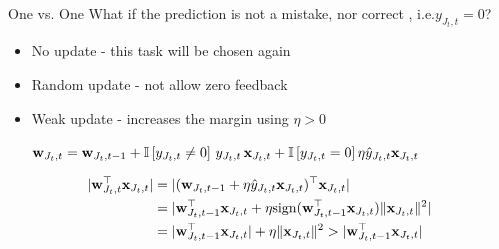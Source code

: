 \documentclass{beamer}
\begin{document}
\begin{frame}{One vs. One}
What if the prediction is not a mistake, nor correct , i.e.$y_{J_t,t}=0$?\newline
\begin{itemize}
\item No update -  this task will be chosen again\newline
\item Random update - not allow zero feedback\newline
\item Weak update - increases the margin using $\eta>0$\newline

$
\mathbf{w}_{J_t,t} = \mathbf{w}_{J_t,t-1}+ \mathbb{I}\left[{y_{J_t,t}\ne0}\right] \, y_{J_t,t}\, \mathbf{x}_{J_t,t} +
 \mathbb{I}\left[{y_{J_t,t}=0}\right] \eta \hat{y}_{J_t,t}\mathbf{x}_{J_t,t}~$
\newline
\end{itemize}
\begin{equation*}
\begin {aligned}
\vert {\mathbf{w}}^{\top}_{J_t,t} \mathbf{x}_{J_t,t} \vert &= \vert
(\mathbf{w}_{J_t,t-1}+ \eta \hat{y}_{J_t,t}\mathbf{x}_{J_t,t})^\top\mathbf{x}_{J_t,t}\vert \\
&= \vert {\mathbf{w}}^{\top}_{J_t,t-1}\mathbf{x}_{J_t,t}+ \eta {\rm sign}({\mathbf{w}}^{\top}_{J_t,t-1}\mathbf{x}_{J_t,t}) \Vert\mathbf{x}_{J_t,t}\Vert^2 \vert \\
&= \vert {\mathbf{w}}^{\top}_{J_t,t-1}\mathbf{x}_{J_t,t}\vert + \eta \Vert\mathbf{x}_{J_t,t}\Vert^2 > \vert {\mathbf{w}}^{\top}_{J_t,t-1}\mathbf{x}_{J_t,t}\vert
\end{aligned}
\end{equation*}
\end{frame}

\end{document}
